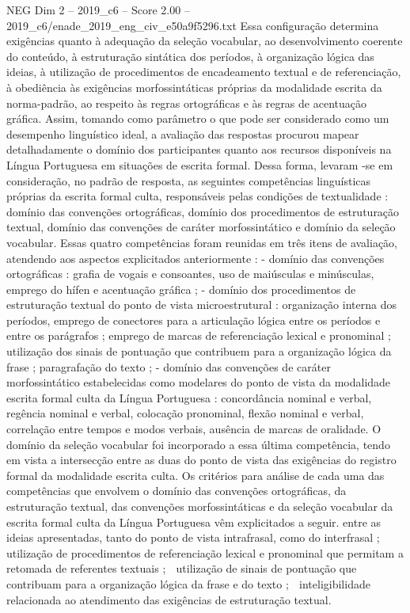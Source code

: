 \begin{textsample}{NEG Dim 2 – 2019\_c6 – Score 2.00 – 2019\_c6/enade\_2019\_eng\_civ\_e50a9f5296.txt}
Essa configuração determina exigências quanto à adequação da seleção vocabular, ao desenvolvimento coerente do conteúdo, à estruturação sintática dos períodos, à organização lógica das ideias, à utilização de procedimentos de encadeamento textual e de referenciação, à obediência às exigências morfossintáticas próprias da modalidade escrita da norma-padrão, ao respeito às regras ortográficas e às regras de acentuação gráfica.
Assim, tomando como parâmetro o que pode ser considerado como um desempenho linguístico ideal, a avaliação das respostas procurou mapear detalhadamente o domínio dos participantes quanto aos recursos disponíveis na Língua Portuguesa em situações de escrita formal.
Dessa forma, levaram -se em consideração, no padrão de resposta, as seguintes competências linguísticas próprias da escrita formal culta, responsáveis pelas condições de textualidade : domínio das convenções ortográficas, domínio dos procedimentos de estruturação textual, domínio das convenções de caráter morfossintático e domínio da seleção vocabular.
Essas quatro competências foram reunidas em três itens de avaliação, atendendo aos aspectos explicitados anteriormente : - domínio das convenções ortográficas : grafia de vogais e consoantes, uso de maiúsculas e minúsculas, emprego do hífen e acentuação gráfica ; - domínio dos procedimentos de estruturação textual do ponto de vista microestrutural : organização interna dos períodos, emprego de conectores para a articulação lógica entre os períodos e entre os parágrafos ; emprego de marcas de referenciação lexical e pronominal ; utilização dos sinais de pontuação que contribuem para a organização lógica da frase ; paragrafação do texto ; - domínio das convenções de caráter morfossintático estabelecidas como modelares do ponto de vista da modalidade escrita formal culta da Língua Portuguesa : concordância nominal e verbal, regência nominal e verbal, colocação pronominal, flexão nominal e verbal, correlação entre tempos e modos verbais, ausência de marcas de oralidade.
O domínio da seleção vocabular foi incorporado a essa última competência, tendo em vista a intersecção entre as duas do ponto de vista das exigências do registro formal da modalidade escrita culta.
Os critérios para análise de cada uma das competências que envolvem o domínio das convenções ortográficas, da estruturação textual, das convenções morfossintáticas e da seleção vocabular da escrita formal culta da Língua Portuguesa vêm explicitados a seguir. entre as ideias apresentadas, tanto do ponto de vista intrafrasal, como do interfrasal ;  utilização de procedimentos de referenciação lexical e pronominal que permitam a retomada de referentes textuais ;  utilização de sinais de pontuação que contribuam para a organização lógica da frase e do texto ;  inteligibilidade relacionada ao atendimento das exigências de estruturação textual.

\end{textsample}
